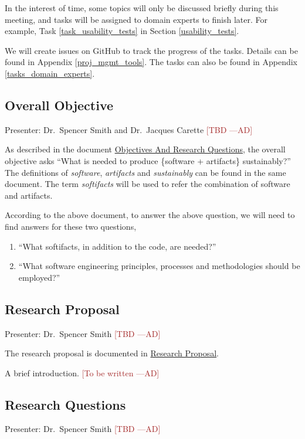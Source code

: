 \documentclass[12pt]{article}
\newcommand{\authornote}[3]{\textcolor{#1}{[#3 ---#2]}}
\newcommand{\authornote}[3]{}
\newcommand{\ad}[1]{\authornote{brown}{AD}{#1}} %
\begin{document}
In the interest of time, some topics will only be discussed briefly during this
meeting, and tasks will be assigned to domain experts to finish later. For
example, Task \ref{task_usability_tests} in Section \ref{usability_tests}.

We will create issues on GitHub to track the progress of the tasks. Details can
be found in Appendix \ref{proj_mgmt_tools}. The tasks can also be found in
Appendix \ref{tasks_domain_experts}.

\subsection{Overall Objective}
\label{overall_objective}
Presenter: Dr.\ Spencer Smith and Dr.\ Jacques Carette \ad{TBD}

As described in the document 
\href{https://github.com/smiths/AIMSS/blob/master/OverallResearchProposal/ObjectivesAndResearchQuestions.pdf}{Objectives
And Research Questions}, the overall objective asks ``What is needed to produce
\{software + artifacts\} sustainably?'' The definitions of \emph{software},
\emph{artifacts} and \emph{sustainably} can be found in the same document. The
term \emph{softifacts} will be used to refer the combination of software and
artifacts.

According to the above document, to answer the above question, we will need to
find answers for these two questions,
\begin{enumerate}
\item ``What softifacts, in addition to the code, are needed?''
\item ``What software engineering principles, processes and methodologies should
be employed?''
\end{enumerate}

\subsection{Research Proposal}
\label{research_proposal}
Presenter: Dr.\ Spencer Smith \ad{TBD}

The research proposal is documented in
\href{https://github.com/smiths/AIMSS/blob/master/OverallResearchProposal/ResearchProposal.pdf}{Research
Proposal}.

A brief introduction. \ad{To be written}

\subsection{Research Questions}
\label{research_questions}
Presenter: Dr.\ Spencer Smith \ad{TBD}
\end{document}
